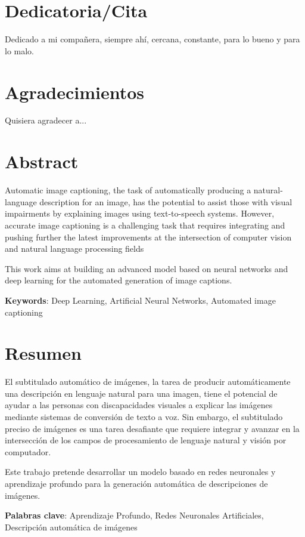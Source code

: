 \chapter*{Dedicatoria/Cita}

Dedicado a mi compañera, siempre ahí, cercana, constante, para lo bueno y para lo malo.

\chapter*{Agradecimientos}

Quisiera agradecer a...

\chapter*{Abstract}

\onehalfspacing

Automatic image captioning, the task of automatically producing a natural-language description for an image, has the potential to assist those with visual impairments by explaining images using text-to-speech systems. However, accurate image captioning is a challenging task that requires integrating and pushing further the latest improvements at the intersection of computer vision and natural language processing fields

This work aims at building an advanced model based on neural networks and deep learning for the automated generation of image captions. 


\vspace{1.5cm}

\textbf{Keywords}: Deep Learning, Artificial Neural Networks, Automated image captioning


\chapter*{Resumen}

\onehalfspacing

El subtitulado automático de imágenes, la tarea de producir automáticamente una descripción en lenguaje natural para una imagen, tiene el potencial de ayudar a las personas con discapacidades visuales a explicar las imágenes mediante sistemas de conversión de texto a voz. Sin embargo, el subtitulado preciso de imágenes es una tarea desafiante que requiere integrar y avanzar en la intersección de los campos de procesamiento de lenguaje natural y visión por computador.

Este trabajo pretende desarrollar un modelo basado en redes neuronales y aprendizaje profundo para la generación automática de descripciones de imágenes.


\vspace{1.5cm}

\textbf{Palabras clave}: Aprendizaje Profundo, Redes Neuronales Artificiales, Descripción automática de imágenes